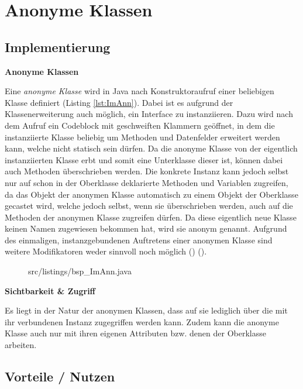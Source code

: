 \section{Anonyme Klassen}
\subsection {Implementierung}

{\Large \bf Anonyme Klassen}

Eine {\it anonyme Klasse} wird in Java nach Konstruktoraufruf einer beliebigen Klasse definiert (Listing \ref{lst:ImAnn}). Dabei ist es aufgrund der Klassenerweiterung auch möglich, ein Interface zu instanziieren.
Dazu wird nach dem Aufruf ein Codeblock mit geschweiften Klammern geöffnet, in dem die instanziierte Klasse beliebig um Methoden und Datenfelder erweitert werden kann, welche nicht statisch sein dürfen.
Da die anonyme Klasse von der eigentlich instanziierten Klasse erbt und somit eine Unterklasse dieser ist, können dabei auch Methoden überschrieben werden.
Die konkrete Instanz kann jedoch selbst nur auf schon in der Oberklasse deklarierte Methoden und Variablen zugreifen, da das Objekt der anonymen Klasse automatisch zu einem Objekt der Oberklasse gecastet wird, welche jedoch selbst, wenn sie überschrieben werden, auch auf die Methoden der anonymen Klasse zugreifen dürfen.
Da diese eigentlich neue Klasse keinen Namen zugewiesen bekommen hat, wird sie anonym genannt.
Aufgrund des einmaligen, instanzgebundenen Auftretens einer anonymen Klasse sind weitere Modifikatoren weder sinnvoll noch möglich (\cite{goll2013java}) (\cite{Oracle:JLS9}).

\begin{figure}[hbt]
\lstset{language=Java}
 {src/listings/bsp_ImAnn.java}
\end{figure}

{\bf Sichtbarkeit \& Zugriff}

Es liegt in der Natur der anonymen Klassen, dass auf sie lediglich über die mit ihr verbundenen Instanz zugegriffen werden kann.
Zudem kann die anonyme Klasse auch nur mit ihren eigenen Attributen bzw. denen der Oberklasse arbeiten.

\subsection{Vorteile / Nutzen}

